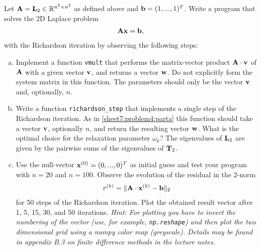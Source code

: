 \begin{Sheet}
\begin{Problem}[Programming]
    Let $\mathbf A=\mathbf L_2\in\mathbb R^{n^2\times n^2}$ as defined above and $\mathbf b=(1,...,1)^T$.
    Write a program that solves the 2D Laplace problem
    \begin{gather*}
      \mathbf A\mathbf x=\mathbf b,
    \end{gather*}
    with the Richardson iteration by observing the following
    steps:
    \begin{enumerate}[(a)]
    \item\label{sheet7:problem4:parta} Implement a function
      \lstinline{vmult} that performs the matrix-vector product
      $\mathbf A\cdot\mathbf v$ of $\mathbf A$ with a given vector $\mathbf v$, and
      returns a vector $\mathbf w$. 
      Do not explicitly form the system matrix in this function.
      The parameters should only be the vector $\mathbf v$ and, optionally, $n$.
    \item Write a function \lstinline{richardson_step} that
      implements a single step of the Richardson iteration. As in
      \eqref{sheet7:problem4:parta} this function should take a vector
      $\mathbf v$, optionally $n$, and return the resulting vector $\mathbf w$.
      What is the optimal choice for the relaxation parameter $\omega_k$?
      The eigenvalues of $\mathbf L_2$ are given by the pairwise sums of the eigenvalues of $\mathbf T_2$.
    \item Use the null-vector $\mathbf x^{(0)} = (0,...,0)^T$ as initial
      guess and test your program with $n=20$ and $n=100$.
      Observe the evolution of the residual in the 2-norm
      \begin{gather*}
        r^{(k)} = \lVert\mathbf A\cdot\mathbf x^{(k)}-\mathbf b\rVert_2
      \end{gather*}
      for 50 steps of the Richardson iteration.  Plot the obtained
      result vector after 1, 5, 15, 30, and 50 iterations.
      \textit{Hint: For plotting you have to invert the numbering of the vector (use, for example, \lstinline{np.reshape}) and then plot the two dimensional grid using a numpy color map (greyscale).
      	Details may be found in appendix B.3 on finite difference methods in the lecture notes. }      
    \end{enumerate}
  \end{Problem}

\end{Sheet}


